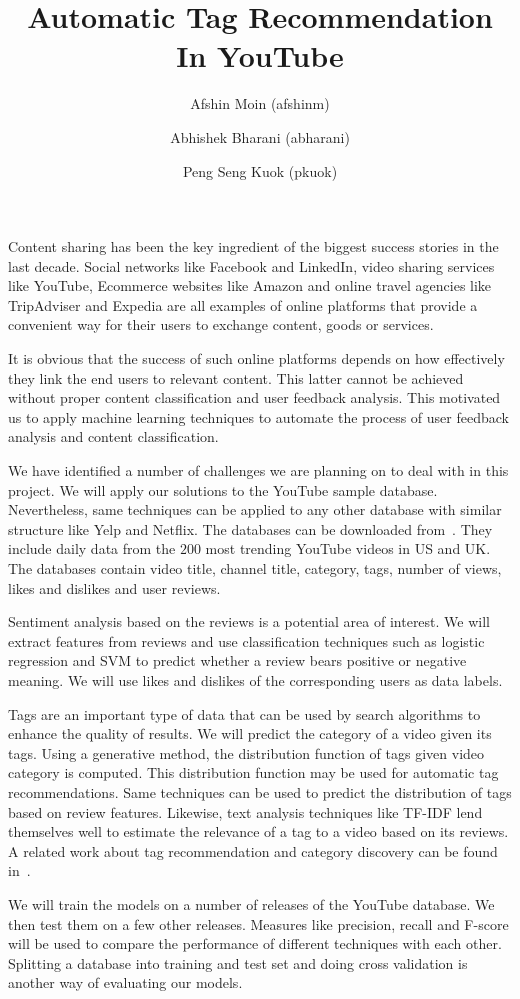 \documentclass[11pt]{llncs}
\begin{document}
\pagestyle{empty} 

\title{Automatic Tag Recommendation In YouTube}
\author{Afshin Moin (afshinm)\institute{}
\and
Abhishek Bharani (abharani)\institute{}
\and 
Peng Seng Kuok (pkuok)\institute{}
}

\maketitle
Content sharing has been the key ingredient of the biggest success stories in the last decade. 
Social networks like Facebook and LinkedIn, video sharing services like YouTube, 
Ecommerce websites like Amazon and online travel agencies like TripAdviser and Expedia are all examples
of online platforms that provide a convenient way for their users to exchange content, goods or services. 

It is obvious that the success of such online platforms depends on how effectively they link the end users to relevant content.
This latter cannot be achieved without proper content classification and user feedback analysis.
This motivated us to apply machine learning techniques to automate the process of user feedback analysis and content classification.

We have identified a number of challenges we are planning on to deal with in this project.
We will apply our solutions to the YouTube sample database. 
Nevertheless, same techniques can be applied to any other database with similar structure like Yelp and Netflix.
The databases can be downloaded from~\cite{youtubedata}. 
They include daily data from the $200$ most trending YouTube videos in US and UK. 
The databases contain video title, channel title, category, tags, number of views, likes and dislikes and user reviews.

Sentiment analysis based on the reviews is a potential area of interest. We will extract features from reviews and use classification techniques such as logistic regression and SVM to predict whether a review bears positive or negative meaning. We will use likes and dislikes of the corresponding users as data labels. 

Tags are an important type of data that can be used by search algorithms to enhance the quality of results. 
We will predict the category of a video given its tags. 
Using a generative method, the distribution function of tags given video category is computed. This distribution function may be used for automatic tag recommendations. Same techniques can be used to predict the distribution of tags based on review features.
Likewise, text analysis techniques like TF-IDF lend themselves well to estimate the relevance of a tag to a video based on its reviews.
A related work about tag recommendation and category discovery can be found in~\cite{tagRecCatDis}.

We will train the models on a number of releases of the YouTube database. We then test them on a few other releases. Measures like precision, recall and F-score will be used to compare the performance of different techniques with each other. Splitting a database into training and test set and doing cross validation is another way of evaluating our models.

\pagestyle{plain}


\end{document}

